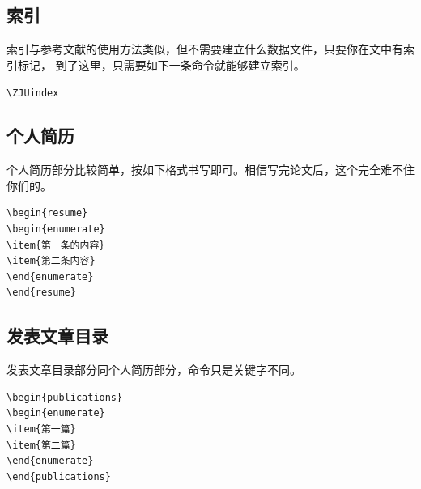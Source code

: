 \subsection{索引}

索引与参考文献的使用方法类似，但不需要建立什么数据文件，只要你在文中有索引标记，
到了这里，只需要如下一条命令就能够建立索引。

\verb+\ZJUindex+


\subsection{个人简历}

个人简历部分比较简单，按如下格式书写即可。相信写完论文后，这个完全难不住你们的。

{
\linespread{1}
\noindent
\begin{verbatim}
\begin{resume}
\begin{enumerate}
\item{第一条的内容}
\item{第二条内容}
\end{enumerate}
\end{resume}
\end{verbatim}
}

\subsection{发表文章目录}

发表文章目录部分同个人简历部分，命令只是关键字不同。

{
\linespread{1}
\noindent
\begin{verbatim}
\begin{publications}
\begin{enumerate}
\item{第一篇}
\item{第二篇}
\end{enumerate}
\end{publications}
\end{verbatim}
}

